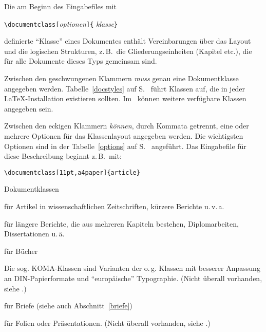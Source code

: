 Die am Beginn des Eingabefiles  mit
\begin{beispiel}
\verb|\documentclass[|\textit{optionen}\verb|]{|%
  \textit{klasse}\verb|}|
\end{beispiel}
definierte "`Klasse"' eines Dokumentes enthält 
Vereinbarungen über 
das Layout und die logischen Strukturen, z.\,B.\ die 
Gliederungseinheiten (Kapitel etc.\@), 
die für alle Dokumente dieses Typs gemeinsam sind.

Zwischen den geschwungenen Klammern \emph{muss} genau eine Dokumentklasse
angegeben werden.  Tabelle~\ref{docstyles} auf S.~\pageref{docstyles}
führt Klassen auf,
die in jeder \LaTeX-Installation existieren sollten.  
Im \local\ können weitere verfügbare 
Klassen angegeben sein.  
 
Zwischen den eckigen Klammern \emph{können}, durch Kommata getrennt, 
eine oder mehrere Optionen für das Klassenlayout
angegeben werden. Die wichtigsten Optionen sind in der 
Tabelle~\ref{options} auf S.~\pageref{options} angeführt.
Das Eingabefile für diese Beschreibung beginnt z.\,B.\ mit:
\begin{beispiel}
\verb|\documentclass[11pt,a4paper]{article}|
\end{beispiel}

\begin{table}[hbpt]
\caption{Dokumentklassen} \label{docstyles}
\begin{lminipage}{11cm}
\begin{ttdescription}%
\item [article] für Artikel in wissenschaftlichen Zeitschriften,
  kürzere Berichte u.\,v.\,a.
 
\item [report] für längere Berichte, die aus mehreren Kapiteln
  bestehen, Diplomarbeiten, Dissertationen u.\,ä.
 
\item [book] für Bücher

\item[scrartcl, scrreprt, scrbook]\quad Die sog. KOMA-Klassen 
sind Varianten der o.\,g. Klassen
mit besserer Anpassung an DIN-Papierformate und "`europäische"'
Typographie. 
(Nicht überall vorhanden, siehe \local.)


\item [letter] für Briefe (siehe auch Abschnitt~\ref{briefe})

\item [foils] für Folien oder Präsentationen.
(Nicht überall vorhanden, siehe \local.)
  
\end{ttdescription}
\end{lminipage}
\end{table}

